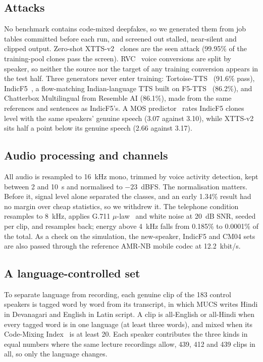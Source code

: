 \documentclass[conference]{IEEEtran}
\begin{document}
\subsection{Attacks}

No benchmark contains code-mixed deepfakes, so we generated them from job tables committed
before each run, and screened out stalled, near-silent and clipped output. Zero-shot
XTTS-v2~\cite{casanova2024xtts} clones are the seen attack (99.95\% of the training-pool clones pass the screen).
RVC~\cite{rvc2023} voice conversions are split by speaker, so neither the source nor the
target of any training conversion appears in the test half. Three generators never enter
training: Tortoise-TTS~\cite{betker2023tortoise} (91.6\% pass),
IndicF5~\cite{ai4bharat2025indicf5}, a flow-matching Indian-language TTS built on
F5-TTS~\cite{chen2024f5tts} (86.2\%), and Chatterbox Multilingual from Resemble AI
(86.1\%), made from the same references and sentences as IndicF5's. A MOS
predictor~\cite{saeki2022utmos} rates IndicF5 clones level with the same speakers' genuine
speech (3.07 against 3.10), while XTTS-v2 sits half a point below its genuine speech (2.66
against 3.17).

\subsection{Audio processing and channels}

All audio is resampled to 16~kHz mono, trimmed by voice activity detection, kept between
2 and 10~s and normalised to $-23$~dBFS. The normalisation matters. Before it, signal level
alone separated the classes, and an early 1.34\% result had no margin over cheap
statistics, so we withdrew it. The telephone condition resamples to 8~kHz, applies G.711
$\mu$-law~\cite{itu1988g711} and white noise at 20~dB SNR, seeded per clip, and resamples
back; energy above 4~kHz falls from 0.185\% to 0.0001\% of the total. As a check on the
simulation, the new-speaker, IndicF5 and CM04 sets are also passed through the reference
AMR-NB mobile codec at 12.2~kbit/s.

\subsection{A language-controlled set}

To separate language from recording, each genuine clip of the 183 control speakers is
tagged word by word from its transcript, in which MUCS writes Hindi in Devanagari and
English in Latin script. A clip is all-English or all-Hindi when every tagged word is in
one language (at least three words), and mixed when its Code-Mixing
Index~\cite{das2014cmi} is at least 20. Each speaker contributes the three kinds in equal
numbers where the same lecture recordings allow, 439, 412 and 439 clips in all, so only the
language changes.
\end{document}
